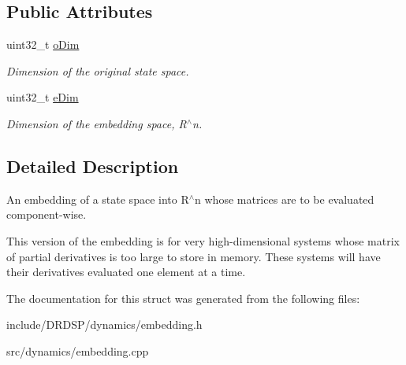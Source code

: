 \subsection*{Public Attributes}
\begin{DoxyCompactItemize}
\item 
\hypertarget{struct_d_r_d_s_p_1_1_embedding_c_w_aa3f8538fb8f9341f744f79a2bda8d8ef}{uint32\-\_\-t \hyperlink{struct_d_r_d_s_p_1_1_embedding_c_w_aa3f8538fb8f9341f744f79a2bda8d8ef}{o\-Dim}}\label{struct_d_r_d_s_p_1_1_embedding_c_w_aa3f8538fb8f9341f744f79a2bda8d8ef}

\begin{DoxyCompactList}\small\item\em Dimension of the original state space. \end{DoxyCompactList}\item 
\hypertarget{struct_d_r_d_s_p_1_1_embedding_c_w_ade05f2b8835edeb8b418bcd27d2d74db}{uint32\-\_\-t \hyperlink{struct_d_r_d_s_p_1_1_embedding_c_w_ade05f2b8835edeb8b418bcd27d2d74db}{e\-Dim}}\label{struct_d_r_d_s_p_1_1_embedding_c_w_ade05f2b8835edeb8b418bcd27d2d74db}

\begin{DoxyCompactList}\small\item\em Dimension of the embedding space, R$^\wedge$n. \end{DoxyCompactList}\end{DoxyCompactItemize}


\subsection{Detailed Description}
An embedding of a state space into R$^\wedge$n whose matrices are to be evaluated component-\/wise. 

This version of the embedding is for very high-\/dimensional systems whose matrix of partial derivatives is too large to store in memory. These systems will have their derivatives evaluated one element at a time. 

The documentation for this struct was generated from the following files\-:\begin{DoxyCompactItemize}
\item 
include/\-D\-R\-D\-S\-P/dynamics/embedding.\-h\item 
src/dynamics/embedding.\-cpp\end{DoxyCompactItemize}
